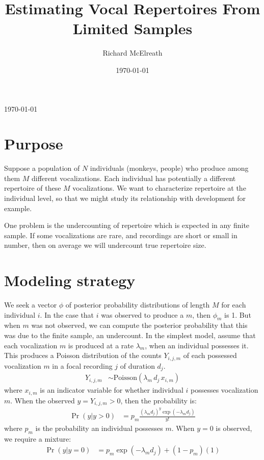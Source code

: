 \documentclass[reqno ,11pt]{amsart}
\begin{document}
\title[Vocal Repertoires]{\large Estimating Vocal Repertoires From Limited Samples}
\author{Richard McElreath}
\address{Department of Human Behavior, Ecology and Culture, Max Planck Institute for Evolutionary Anthropology, Deutscher Platz 6, 04103 Leipzig, Germany}
\date{\today}

\maketitle

{\vspace{-6pt}\footnotesize\begin{center}\today\end{center}\vspace{24pt}}

\linenumbers
\modulolinenumbers[5]

\section{Purpose}

Suppose a population of $N$ individuals (monkeys, people) who produce among them $M$ different vocalizations. Each individual has potentially a different repertoire of these $M$ vocalizations. We want to characterize repertoire at the individual level, so that we might study its relationship with development for example. 

One problem is the undercounting of repertoire which is expected in any finite sample. If some vocalizations are rare, and recordings are short or small in number, then on average we will undercount true repertoire size. 

\section{Modeling strategy}

We seek a vector $\phi$ of posterior probability distributions of length $M$ for each individual $i$. In the case that $i$ was observed to produce a $m$, then $\phi_m$ is 1. But when $m$ was not observed, we can compute the posterior probability that this was due to the finite sample, an undercount. 
In the simplest model, assume that each vocalization $m$ is produced at a rate $\lambda_m$, when an individual possesses it. This produces a Poisson distribution of the counts $Y_{i,j,m}$ of each possessed vocalization $m$ in a focal recording $j$ of duration $d_j$.
\begin{align*}
Y_{i,j,m} &\sim \mathrm{Poisson}(  \lambda_m \, d_j \, x_{i,m} )
\end{align*}
where $x_{i,m}$ is an indicator variable for whether individual $i$ possesses vocalization $m$. 
When the observed $y=Y_{i,j,m}>0$, then the probability is:
\begin{align*}
\Pr(y|y>0) &= p_{m} \frac{( \lambda_m d_j )^y \exp(-\lambda_m d_j) }{ y! }
\end{align*}
where $p_m$ is the probability an individual possesses $m$. When $y=0$ is observed, we require a mixture:
\begin{align*}
\Pr(y|y=0) &= p_{m} \exp(-\lambda_m d_j) + (1-p_{m})(1)
\end{align*}
\end{document}

